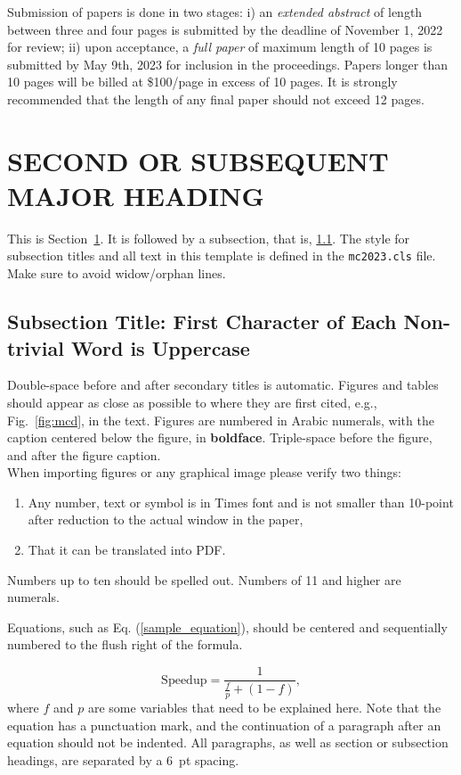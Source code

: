\documentclass[letterpaper]{mc2023}
\begin{document}
Submission of papers is done in two stages: i) an {\it extended abstract} of length between three and four pages is submitted by the deadline of November 1, 2022 for review; ii) upon acceptance, a {\it full paper} of maximum length of 10 pages is submitted by May 9th, 2023 for inclusion in the proceedings.
Papers longer than 10 pages
will be billed at \$100/page in excess of 10 pages.  It is strongly recommended
that the length of any final paper should not exceed 12 pages.

\section{SECOND OR SUBSEQUENT MAJOR HEADING}
\label{sec:first}

This is Section~\ref{sec:first}. It is followed by a subsection, that is,
\ref{sec:second}. The style for subsection titles and all text in this template is defined
in the \texttt{mc2023.cls} file.  Make sure to avoid widow/orphan lines.

\subsection{Subsection Title: First Character of Each Non-trivial Word is Uppercase}
\label{sec:second}

Double-space before and after secondary titles is automatic.  Figures and
tables should appear as close as possible to where they are first
cited, e.g., Fig.~\ref{fig:mcd}, in the text.  Figures are numbered in Arabic
numerals, with the caption centered below the figure, in \textbf{boldface}.
Triple-space before the figure, and after the figure caption.\\


When importing figures or any graphical image please verify two things:
\begin{enumerate}
\item Any number, text or symbol is in Times font and is not smaller than
  10-point after reduction to the actual window in the paper,
\item That it can be translated into PDF.
\end{enumerate}

Numbers up to ten should be spelled out. Numbers of 11 and higher are numerals.

Equations, such as Eq. (\ref{sample_equation}), should be centered and
sequentially numbered to the flush right of the formula.

\begin{equation}
  \label{sample_equation}
  \mathrm{Speedup}=\frac{1}{\frac{f}{p}+(1-f)},
\end{equation}
where $f$ and $p$ are some variables that need to be explained here.  Note that the equation has a punctuation mark, and the continuation of a paragraph after an equation should not be indented.
All paragraphs, as well as section or subsection headings, are separated by a 6~pt spacing.
\end{document}
